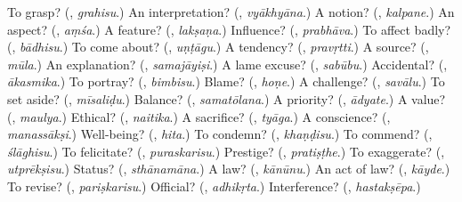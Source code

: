 \begin{tcolorbox}[breakable,colback=teal!4,colframe=teal!35!black,title={Before you move on}]
To grasp? (\textbf{}, \emph{grahisu}.) An interpretation? (\textbf{}, \emph{vyākhyāna}.) A notion? (\textbf{}, \emph{kalpane}.) An aspect? (\textbf{}, \emph{aṃśa}.) A feature? (\textbf{}, \emph{lakṣaṇa}.) Influence? (\textbf{}, \emph{prabhāva}.) To affect badly? (\textbf{}, \emph{bādhisu}.) To come about? (\textbf{}, \emph{uṇṭāgu}.) A tendency? (\textbf{}, \emph{pravṛtti}.) A source? (\textbf{}, \emph{mūla}.) An explanation? (\textbf{}, \emph{samajāyiṣi}.) A lame excuse? (\textbf{}, \emph{sabūbu}.) Accidental? (\textbf{}, \emph{ākasmika}.) To portray? (\textbf{}, \emph{bimbisu}.) Blame? (\textbf{}, \emph{hoṇe}.) A challenge? (\textbf{}, \emph{savālu}.) To set aside? (\textbf{}, \emph{mīsaliḍu}.) Balance? (\textbf{}, \emph{samatōlana}.) A priority? (\textbf{}, \emph{ādyate}.) A value? (\textbf{}, \emph{maulya}.) Ethical? (\textbf{}, \emph{naitika}.) A sacrifice? (\textbf{}, \emph{tyāga}.) A conscience? (\textbf{}, \emph{manassākṣi}.) Well-being? (\textbf{}, \emph{hita}.) To condemn? (\textbf{}, \emph{khaṇḍisu}.) To commend? (\textbf{}, \emph{ślāghisu}.) To felicitate? (\textbf{}, \emph{puraskarisu}.) Prestige? (\textbf{}, \emph{pratiṣṭhe}.) To exaggerate? (\textbf{}, \emph{utprēkṣisu}.) Status? (\textbf{}, \emph{sthānamāna}.) A law? (\textbf{}, \emph{kānūnu}.) An act of law? (\textbf{}, \emph{kāyde}.) To revise? (\textbf{}, \emph{pariṣkarisu}.) Official? (\textbf{}, \emph{adhikṛta}.) Interference? (\textbf{}, \emph{hastakṣēpa}.)
\end{tcolorbox}
